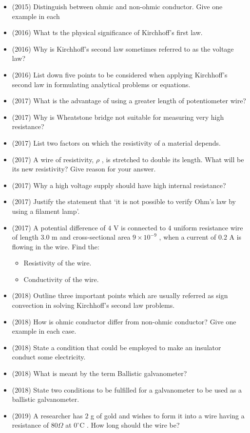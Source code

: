 \documentclass{article}
\begin{document}
\begin{itemize}
\begin{itemize}
\end{itemize}
\item (2015)  Distinguish between ohmic and non-ohmic conductor. Give one example in each
\item (2016)  What ts the physical significance of Kirchhoff’s first law.
\item (2016)  Why is Kirchhoff’s second law sometimes referred to as the voltage law?
\item (2016)  List down five points to be considered when applying Kirchhoff’s second law in formulating analytical problems or equations.
\item (2017)  What is the advantage of using a greater length of potentiometer wire?
\item (2017)  Why is Wheatstone bridge not suitable for measuring very high resistance?
\item (2017)  List two factors on which the resistivity of a material depends. 
\item (2017)  A wire of resistivity, $ \rho $ , is stretched to double its length. What will be its new resistivity? Give reason for your answer. 
\item (2017)  Why a high voltage supply should have high internal resistance?
\item (2017)  Justify the statement that ‘it is not possible to verify Ohm's law by using a filament lamp’.
\item (2017)  A potential difference of $ 4$ V is connected to $ 4$ uniform resistance wire of length $ 3.0$ m and cross-sectional area $ 9\times 10^{-9}$ , when a current of $ 0.2$ A is flowing in the wire. Find the:
 \begin{itemize}
\item Resistivity of the wire.
\item Conductivity of the wire. 
\end{itemize}
\item (2018)  Outline three important points which are usually referred as sign convection in  solving Kirchhoff’s second law problems. 
\item (2018)  How is ohmic conductor differ from non-ohmic conductor? Give one example in each case. 
\item (2018)  State a condition that could be employed to make an insulator conduct some electricity. 
\item (2018)  What is meant by the term Ballistic galvanometer? 
\item (2018)  State two conditions to be fulfilled for a galvanometer to be used as a ballistic galvanometer. 
\item (2019)  A researcher has $ 2$ g of gold and wishes to form it into a wire having a resistance of $ 80\Omega $ at $ 0^{\circ}$C . How long should the wire be? 
\end{itemize}
\end{document}
